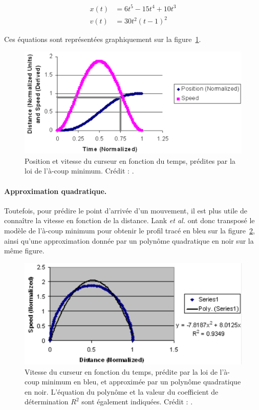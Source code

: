 	\begin{align}
		\label{eq:kepP}
		x(t) &= 6t^{5} - 15t^{4} + 10t^{3} \\
		\label{eq:kepV}
		v(t) &= 30t^{2}(t - 1)^{2}
	\end{align}
	
	Ces équations sont représentées graphiquement sur la figure~\ref{fig:kepPS}.
	
	\begin{figure}[H]
		\centering
		\includegraphics[width=\textwidth]{figures/ch2/kepPS}
		\caption[Loi de l'à-coup minimum --- position et vitesse du curseur en fonction du temps]{Position et vitesse du curseur en fonction du temps, prédites par la loi de l'à-coup minimum. Crédit : \cite{lank2007endpoint}.}
		\label{fig:kepPS}
	\end{figure}
	
	\paragraph{Approximation quadratique.}
	Toutefois, pour prédire le point d'arrivée d'un mouvement, il est plus utile de connaître la vitesse en fonction de la distance. Lank \emph{et al.} ont donc transposé le modèle de l'à-coup minimum pour obtenir le profil tracé en bleu sur la figure~\ref{fig:kepQuad}, ainsi qu'une approximation donnée par un polynôme quadratique en noir sur la même figure.
	
	\begin{figure}[H]
		\centering
		\includegraphics[width=\textwidth]{figures/ch2/kepQuad}
		\caption[Loi de l'à-coup minimum --- vitesse du curseur en fonction du temps, approximation quadratique]{Vitesse du curseur en fonction du temps, prédite par la loi de l'à-coup minimum en bleu, et approximée par un polynôme quadratique en noir. L'équation du polynôme et la valeur du coefficient de détermination $R^{2}$ sont également indiquées. Crédit : \cite{lank2007endpoint}.}
		\label{fig:kepQuad}
	\end{figure}
	
